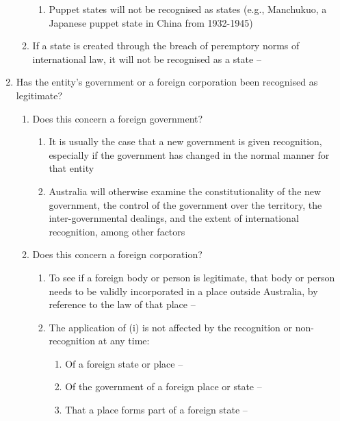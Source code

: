 \begin{enumerate}
\begin{enumerate}
\begin{enumerate}
            \item Puppet states will not be recognised as states (e.g., Manchukuo, a Japanese puppet state in China from 1932-1945)
        \end{enumerate}
        \item If a state is created through the breach of peremptory norms of international law, it will not be recognised as a state -- 
    \end{enumerate}
    \item Has the entity's government or a foreign corporation been recognised as legitimate?
    \begin{enumerate}
        \item Does this concern a foreign government?
        \begin{enumerate}
            \item It is usually the case that a new government is given recognition, especially if the government has changed in the normal manner for that entity
            \item Australia will otherwise examine the constitutionality of the new government, the control of the government over the territory, the inter-governmental dealings, and the extent of international recognition, among other factors
        \end{enumerate}
        \item Does this concern a foreign corporation?
        \begin{enumerate}
            \item To see if a foreign body or person is legitimate, that body or person needs to be validly incorporated in a place outside Australia, by reference to the law of that place -- 
            \item The application of (i) is not affected by the recognition or non-recognition at any time:
            \begin{enumerate}
                \item Of a foreign state or place -- 
                \item Of the government of a foreign place or state -- 
                \item That a place forms part of a foreign state -- 

\end{enumerate}
\end{enumerate}
\end{enumerate}
\end{enumerate}
